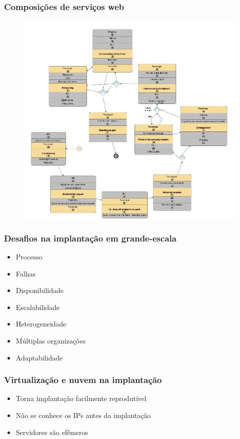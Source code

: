 \documentclass{beamer}
\begin{document}

\begin{frame}
\frametitle{Composições de serviços web}

\begin{figure}
\includegraphics[width=0.7\linewidth]{img/chorwp6}
\end{figure}


\end{frame}


\begin{frame}
\frametitle{Desafios na implantação em grande-escala}

\begin{itemize}
\item Processo
\item Falhas
\item Disponibilidade
\item Escalabilidade
\item Heterogeneidade
\item Múltiplas organizações
\item Adaptabilidade
\end{itemize}

\end{frame}


\begin{frame}
\frametitle{Virtualização e nuvem na implantação}

\begin{itemize}
\item Torna implantação facilmente reprodutível
\item Não se conhece os IPs antes da implantação
\item Servidores são efêmeros
\end{itemize}


\end{frame}
\end{document}
